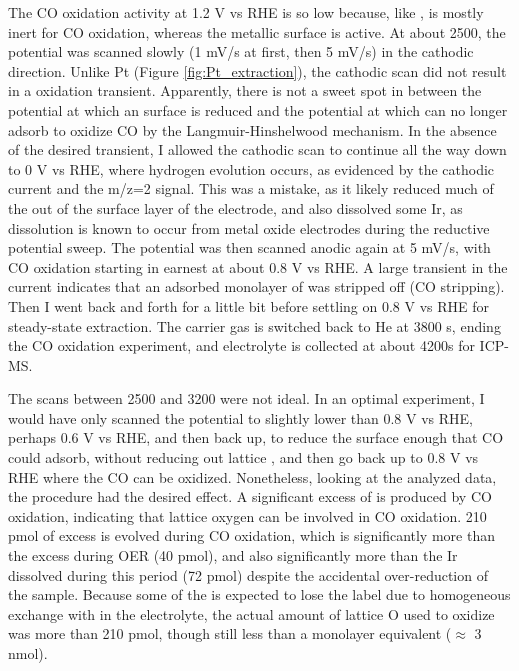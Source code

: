 The CO oxidation activity at 1.2 V vs RHE is so low because, like ,  is mostly inert for CO oxidation, whereas the metallic surface is active. At about 2500, the potential was scanned slowly (1 mV/s at first, then 5 mV/s) in the cathodic direction. Unlike Pt (Figure \ref{fig:Pt_extraction}), the cathodic scan did not result in a  oxidation transient. Apparently, there is not a sweet spot in between the potential at which an  surface is reduced and the potential at which  can no longer adsorb to oxidize CO by the Langmuir-Hinshelwood mechanism. In the absence of the desired transient, I allowed the cathodic scan to continue all the way down to 0 V vs RHE, where hydrogen evolution occurs, as evidenced by the cathodic current and the m/z=2 signal. This was a mistake, as it likely reduced much of the  out of the surface layer of the electrode, and also dissolved some Ir, as dissolution is known to occur from metal oxide electrodes during the reductive potential sweep\cite{Cherevko2016}. The potential was then scanned anodic again at 5 mV/s, with CO oxidation starting in earnest at about 0.8 V vs RHE. A large transient in the current indicates that an adsorbed monolayer of  was stripped off (CO stripping). Then I went back and forth for a little bit before settling on 0.8 V vs RHE for steady-state extraction. The carrier gas is switched back to He at 3800 s, ending the CO oxidation experiment, and electrolyte is collected at about 4200s for ICP-MS. 

The scans between 2500 and 3200 were not ideal. In an optimal experiment, I would have only scanned the potential to slightly lower than 0.8 V vs RHE, perhaps 0.6 V vs RHE, and then back up, to reduce the surface enough that CO could adsorb, without reducing out lattice , and then go back up to 0.8 V vs RHE where the CO can be oxidized. Nonetheless, looking at the analyzed data, the procedure had the desired effect. A significant excess of  is produced by CO oxidation, indicating that lattice oxygen can be involved in CO oxidation. 210 pmol of excess  is evolved during CO oxidation, which is significantly more than the excess  during OER (40 pmol), and also significantly more than the Ir dissolved during this period (72 pmol) despite the accidental over-reduction of the sample. Because some of the  is expected to lose the  label due to homogeneous exchange with  in the electrolyte, the actual amount of lattice O used to oxidize  was more than 210 pmol, though still less than a monolayer equivalent ($\approx$ 3 nmol).

